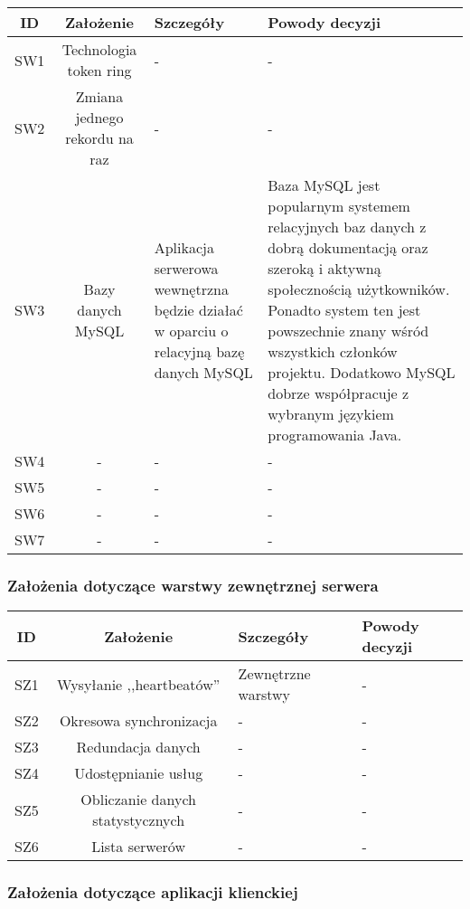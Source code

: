\begin{center}
\begin{tabular}{|c|c|l|l|}
\hline
\textbf{ID} & \textbf{Założenie} & \textbf{Szczegóły} & \textbf{Powody decyzji} \\
\hline
\label{z:sw1} SW1 & Technologia token ring &  - & - \\
\hline
\label{z:sw2} SW2 & Zmiana jednego rekordu na raz &  - & - \\
\hline
\label{z:sw3} SW3 & Bazy danych MySQL & Aplikacja serwerowa wewnętrzna będzie działać w oparciu o relacyjną bazę danych MySQL & 
Baza MySQL jest popularnym systemem relacyjnych baz danych z dobrą dokumentacją oraz szeroką i aktywną społecznością użytkowników. Ponadto system ten jest powszechnie znany wśród wszystkich członków projektu. Dodatkowo MySQL dobrze współpracuje z wybranym językiem programowania Java.
\\
\hline
\label{z:sw4} SW4 & - &  - & - \\
\hline
\label{z:sw5} SW5 & - &  - & - \\
\hline
\label{z:sw6} SW6 & - &  - & - \\
\hline
\label{z:sw7} SW7 & - &  - & - \\
\hline

\end{tabular} 

\subsubsection*[Założenia dotyczące warstwy zewnętrznej serwera]{Założenia dotyczące warstwy zewnętrznej serwera} \label{z:sz}

\begin{tabular}{|c|c|l|l|}
\hline
\textbf{ID} & \textbf{Założenie} & \textbf{Szczegóły} & \textbf{Powody decyzji} \\
\hline
\label{z:sz1} SZ1 & Wysyłanie ,,heartbeatów'' &  Zewnętrzne warstwy & - \\
\hline
\label{z:sz2} SZ2 & Okresowa synchronizacja &  - & - \\
\hline
\label{z:sz3} SZ3 & Redundacja danych &  - & - \\
\hline
\label{z:sz4} SZ4 & Udostępnianie usług &  - & - \\
\hline
\label{z:sz5} SZ5 & Obliczanie danych statystycznych &  - & - \\
\hline
\label{z:sz6} SZ6 & Lista serwerów &  - & - \\
\hline
\end{tabular} 

\subsubsection*[Założenia dotyczące aplikacji klienckiej]{Założenia dotyczące aplikacji klienckiej} \label{z:k}


\end{center}
